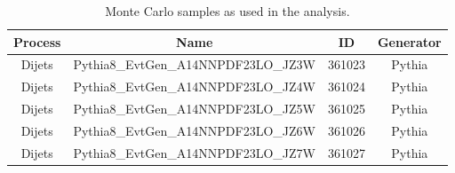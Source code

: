 \begin{table}[h!]
\centering
\begin{tabular}{cccc}
Process & Name & ID & Generator \\
\hline 
\hline
Dijets & Pythia8\_EvtGen\_A14NNPDF23LO\_JZ3W & 361023 & Pythia  \\
Dijets & Pythia8\_EvtGen\_A14NNPDF23LO\_JZ4W & 361024 & Pythia  \\
Dijets & Pythia8\_EvtGen\_A14NNPDF23LO\_JZ5W & 361025 & Pythia  \\
Dijets & Pythia8\_EvtGen\_A14NNPDF23LO\_JZ6W & 361026 & Pythia  \\
Dijets & Pythia8\_EvtGen\_A14NNPDF23LO\_JZ7W & 361027 & Pythia  \\
\hline
\hline
\end{tabular}
\caption{Monte Carlo samples as used in the analysis. }
\label{tab:mc_samples1}
\end{table}



